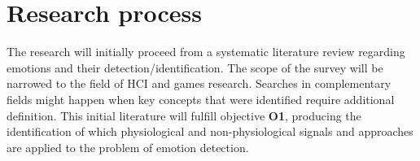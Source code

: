 

\section{Research process}
\label{sec:research-process}

The research will initially proceed from a systematic literature review regarding emotions and their detection/identification. The scope of the survey will be narrowed to the field of HCI and games research. Searches in complementary fields might happen when key concepts that were identified require additional definition. This initial literature will fulfill objective \textbf{O1}, producing the identification of which physiological and non-physiological signals and approaches are applied to the problem of emotion detection.

